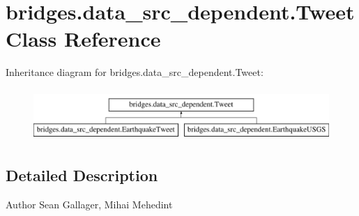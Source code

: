 \hypertarget{classbridges_1_1data__src__dependent_1_1_tweet}{}\section{bridges.\+data\+\_\+src\+\_\+dependent.\+Tweet Class Reference}
\label{classbridges_1_1data__src__dependent_1_1_tweet}
Inheritance diagram for bridges.\+data\+\_\+src\+\_\+dependent.\+Tweet\+:\begin{figure}[H]
\begin{center}
\leavevmode
\includegraphics[height=1.992882cm]{classbridges_1_1data__src__dependent_1_1_tweet}
\end{center}
\end{figure}


\subsection{Detailed Description}
\begin{DoxyAuthor}{Author}
Sean Gallager, Mihai Mehedint 
\end{DoxyAuthor}
